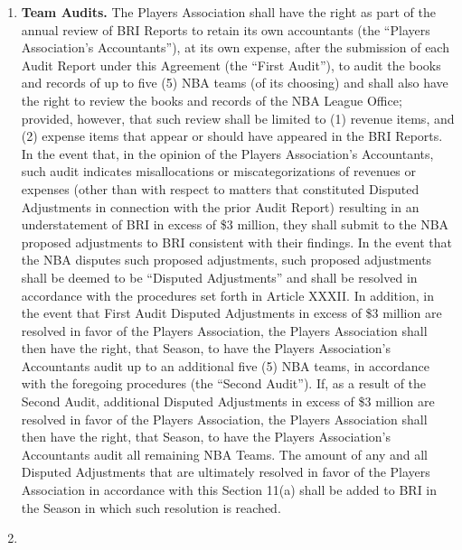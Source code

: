 \documentclass[
]{book}
\providecommand{\tightlist}{%
  \setlength{\itemsep}{0pt}\setlength{\parskip}{0pt}}
\begin{document}
\begin{enumerate}
\def\labelenumi{(\alph{enumi})}
\tightlist
\item
  \textbf{Team Audits.} The Players Association shall have the right as part of the annual review of BRI Reports to retain its own accountants (the ``Players Association's Accountants''), at its own expense, after the submission of each Audit Report under this Agreement (the ``First Audit''), to audit the books and records of up to five (5) NBA teams (of its choosing) and shall also have the right to review the books and records of the NBA League Office; provided, however, that such review shall be limited to (1) revenue items, and (2) expense items that appear or should have appeared in the BRI Reports. In the event that, in the opinion of the Players Association's Accountants, such audit indicates misallocations or miscategorizations of revenues or expenses (other than with respect to matters that constituted Disputed Adjustments in connection with the prior Audit Report) resulting in an understatement of BRI in excess of \$3 million, they shall submit to the NBA proposed adjustments to BRI consistent with their findings. In the event that the NBA disputes such proposed adjustments, such proposed adjustments shall be deemed to be ``Disputed Adjustments'' and shall be resolved in accordance with the procedures set forth in Article XXXII. In addition, in the event that First Audit Disputed Adjustments in excess of \$3 million are resolved in favor of the Players Association, the Players Association shall then have the right, that Season, to have the Players Association's Accountants audit up to an additional five (5) NBA teams, in accordance with the foregoing procedures (the ``Second Audit''). If, as a result of the Second Audit, additional Disputed Adjustments in excess of \$3 million are resolved in favor of the Players Association, the Players Association shall then have the right, that Season, to have the Players Association's Accountants audit all remaining NBA Teams. The amount of any and all Disputed Adjustments that are ultimately resolved in favor of the Players Association in accordance with this Section 11(a) shall be added to BRI in the Season in which such resolution is reached.
\item

\end{enumerate}
\end{document}

